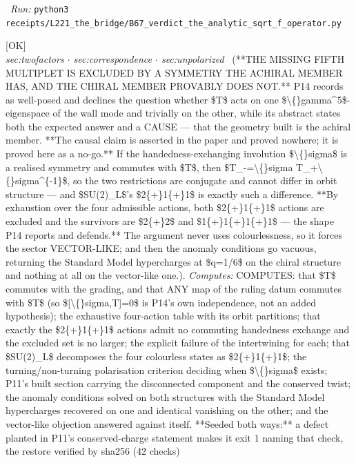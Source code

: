 \begin{description}
\ \emph{Run:} \texttt{python3 receipts/L221\_the\_bridge/B67\_verdict\_the\_analytic\_sqrt\_f\_operator.py}
\item[\label{rcpt:W1_the_two_plus_one_plus_one_is_excluded_by_a_symmetry_the_chiral_member_does_not_have}\texttt{W1\_the\_two\_plus\_one\_plus\_one\_is\_excluded\_by\_a\_symmetry\_the\_chiral\_member\_does\_not\_have}]\hfill\textsf{[OK]}\\
\textit{sec:twofactors \ensuremath{\cdot} sec:correspondence \ensuremath{\cdot} sec:unpolarized} \ (**THE MISSING FIFTH MULTIPLET IS EXCLUDED BY A SYMMETRY THE ACHIRAL MEMBER HAS, AND THE CHIRAL MEMBER PROVABLY DOES NOT.** P14 records as well-posed and declines the question whether \$T\$ acts on one \$\textbackslash\{\}gamma\textasciicircum{}5\$-eigenspace of the wall mode and trivially on the other, while its abstract states both the expected answer and a CAUSE --- that the geometry built is the achiral member. **The causal claim is asserted in the paper and proved nowhere; it is proved here as a no-go.** If the handedness-exchanging involution \$\textbackslash\{\}sigma\$ is a realised symmetry and commutes with \$T\$, then \$T\textbar{}\_-=\textbackslash\{\}sigma T\textbar{}\_+\textbackslash\{\}sigma\textasciicircum{}\{-1\}\$, so the two restrictions are conjugate and cannot differ in orbit structure --- and \$SU(2)\_L\$'s \$2\{+\}1\{+\}1\$ is exactly such a difference. **By exhaustion over the four admissible actions, both \$2\{+\}1\{+\}1\$ actions are excluded and the survivors are \$2\{+\}2\$ and \$1\{+\}1\{+\}1\{+\}1\$ --- the shape P14 reports and defends.** The argument never uses colourlessness, so it forces the sector VECTOR-LIKE; and then the anomaly conditions go vacuous, returning the Standard Model hypercharges at \$q=1/6\$ on the chiral structure and nothing at all on the vector-like one.). 
\emph{Computes:} COMPUTES: that \$T\$ commutes with the grading, and that ANY map of the ruling datum commutes with \$T\$ (so \$[\textbackslash\{\}sigma,T]=0\$ is P14's own independence, not an added hypothesis); the exhaustive four-action table with its orbit partitions; that exactly the \$2\{+\}1\{+\}1\$ actions admit no commuting handedness exchange and the excluded set is no larger; the explicit failure of the intertwining for each; that \$SU(2)\_L\$ decomposes the four colourless states as \$2\{+\}1\{+\}1\$; the turning/non-turning polarisation criterion deciding when \$\textbackslash\{\}sigma\$ exists; P11's built section carrying the disconnected component and the conserved twist; the anomaly conditions solved on both structures with the Standard Model hypercharges recovered on one and identical vanishing on the other; and the vector-like objection answered against itself. **Seeded both ways:** a defect planted in P11's conserved-charge statement makes it exit 1 naming that check, the restore verified by sha256 (42 checks)

\end{description}
